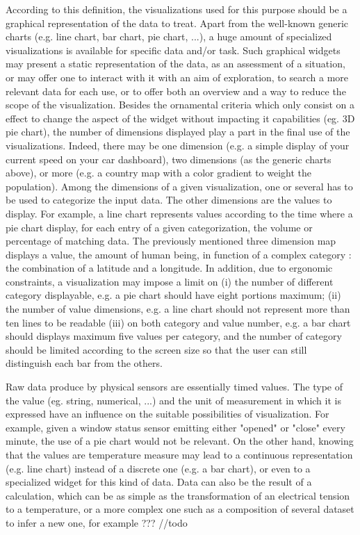 \documentclass{acm_proc_article-sp}
\begin{document}
According to this definition, the visualizations used for this purpose should
be a graphical representation of the data to treat. Apart from the well-known
generic charts (e.g. line chart, bar chart, pie chart, ...), a huge amount
of specialized visualizations is available for specific data and/or task.
Such graphical widgets may present a static representation of the data, as an
assessment of a situation, or may offer one to interact with it with an aim of
exploration, to search a more relevant data for each use, or to offer both an
overview and a way to reduce the scope of the visualization.
Besides the ornamental criteria which only consist on a effect to change the
aspect of the widget without impacting it capabilities (eg. 3D pie chart), the
number of dimensions displayed play a part in the final use of the visualizations.
Indeed, there may be one dimension (e.g. a simple display of your current speed
on your car dashboard), two dimensions (as the generic charts above), or more
(e.g. a country map with a color gradient to weight the population). 
Among the dimensions of a given visualization, one or several has to be used to
categorize the input data. The other dimensions are the values to display.
For example, a line chart represents values according to the time where
a pie chart display, for each entry of a given categorization, the volume
or percentage of matching data. The previously mentioned three dimension map
displays a value, the amount of human being, in function of a complex category :
the combination of a latitude and a longitude.
In addition, due to ergonomic constraints, a visualization may impose a limit on
(i) the number of different category displayable, e.g. a pie chart should
have eight portions maximum;
(ii) the number of value dimensions, e.g. a line chart should not represent more
than ten lines to be readable
(iii) on both category and value number, e.g. a bar chart should displays maximum
five values per category, and the number of category should be limited according
to the screen size so that the user can still distinguish each bar from the others.

Raw data produce by physical sensors are essentially timed values. The type of
the value (eg. string, numerical, ...) and the unit of measurement in which it
is expressed have an influence on the suitable possibilities of visualization.
For example, given a window status sensor emitting either "opened" or "close"
every minute, the use of a pie chart would not be relevant. On the other hand,
knowing that the values are temperature measure may lead to a continuous representation
(e.g. line chart) instead of a discrete one (e.g. a bar chart), or even to a specialized
widget for this kind of data.
Data can also be the result of a calculation, which can be as simple as the transformation
of an electrical tension to a temperature, or a more complex one such as a composition
of several dataset to infer a new one, for example ??? //todo
\end{document}
